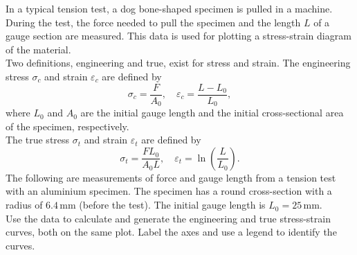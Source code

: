 \documentclass[a4paper, 12pt]{report}
\def\ni{blue!20!white}
\def\link{blue!50!black}
\begin{document}
    

    \newpage
    \begin{tcolorbox}[title={\color{black}{\section{Q8}}}, colback=white, colframe=\ni, boxrule=1mm, width=1\textwidth]    
    In a typical tension test, a dog bone-shaped specimen is pulled in a machine. During the test, the force needed to pull the specimen and the length \( L \) of a gauge section are measured. This data is used for plotting a stress-strain diagram of the material.\\[8pt]
    Two definitions, engineering and true, exist for stress and strain. The engineering stress \( \sigma_c \) and strain \( \varepsilon_c \) are defined by
    \[\sigma_c = \frac{F}{A_0}, \quad \varepsilon_c = \frac{L - L_0}{L_0},\]
    where \( L_0 \) and \( A_0 \) are the initial gauge length and the initial cross-sectional area of the specimen, respectively.\\[8pt]
    The true stress \( \sigma_t \) and strain \( \varepsilon_t \) are defined by 
    \[\sigma_t = \frac{F L_0}{A_0 L}, \quad \varepsilon_t = \ln\left(\frac{L}{L_0}\right).\]
    The following are measurements of force and gauge length from a tension test with an aluminium specimen. The specimen has a round cross-section with a radius of \( 6.4 \, \text{mm} \) (before the test). The initial gauge length is \( L_0 = 25 \, \text{mm} \).\\[8pt]
    Use the data to calculate and generate the engineering and true stress-strain curves, both on the same plot. Label the axes and use a legend to identify the curves.\\[8pt]
    

\end{tcolorbox}
\end{document}
